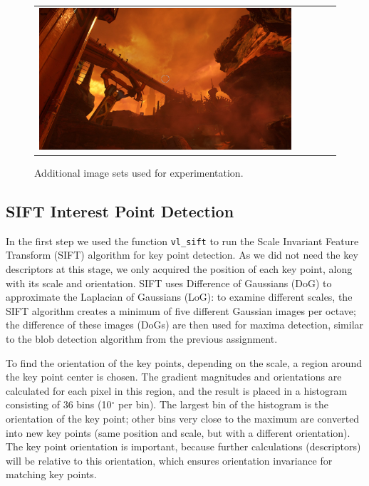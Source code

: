 \begin{figure}[h]
\begin{tabular}{ccccc}
	\includegraphics[width=\mywidth]{figures/doom3.jpg} \\

	\end{tabular}
	\caption{Additional image sets used for experimentation.}
	\label{fig:a4:imagesets}
\end{figure}

\subsection{SIFT Interest Point Detection}

In the first step we used the function \texttt{vl\_sift} to run the Scale Invariant Feature Transform (SIFT) \cite{Lowe04} algorithm for key point detection. As we did not need the key descriptors at this stage, we only acquired the position of each key point, along with its scale and orientation. SIFT uses Difference of Gaussians (DoG) to approximate the Laplacian of Gaussians (LoG): to examine different scales, the SIFT algorithm creates a minimum of five different Gaussian images per octave; the difference of these images (DoGs) are then used for maxima detection, similar to the blob detection algorithm from the previous assignment. 

To find the orientation of the key points, depending on the scale, a region around the key point center is chosen. The gradient magnitudes and orientations are calculated for each pixel in this region, and the result is placed in a histogram consisting of 36 bins (10$^\circ$ per bin). The largest bin of the histogram is the orientation of the key point; other bins very close to the maximum are converted into new key points (same position and scale, but with a different orientation). The key point orientation is important, because further calculations (descriptors) will be relative to this orientation, which ensures orientation invariance for matching key points.

